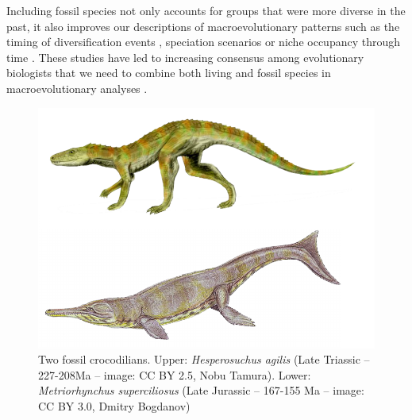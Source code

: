 Including fossil species not only accounts for groups that were more diverse in the past, it also improves our descriptions of macroevolutionary patterns such as the timing of diversification events \citep[e.g. significantly reducing node age confidence intervals;][]{ronquista2012}, speciation scenarios \citep[e.g. revealing hidden vicariance patterns;][]{Wood01032013} or niche occupancy through time \citep[e.g.][]{pearmanniche2008}.
These studies have led to increasing consensus among evolutionary biologists that we need to combine both living and fossil species in macroevolutionary analyses \citep{jacksonwhat2006,quentaldiversity2010,dietlconservation2011,slaterunifying2013,fritzdiversity2013,benton2015}.

\begin{figure}[!h] 
\centering
    \includegraphics[keepaspectratio=true]{introduction/figures/Crocodilians.pdf}
\caption[Fossil crocodilians]{Two fossil crocodilians. Upper: \textit{Hesperosuchus agilis} (Late Triassic -- 227-208Ma -- image: CC BY 2.5, Nobu Tamura). Lower: \textit{Metriorhynchus superciliosus} (Late Jurassic -- 167-155 Ma -- image: CC BY 3.0, Dmitry Bogdanov)}
\label{fig:intro}
\end{figure}


